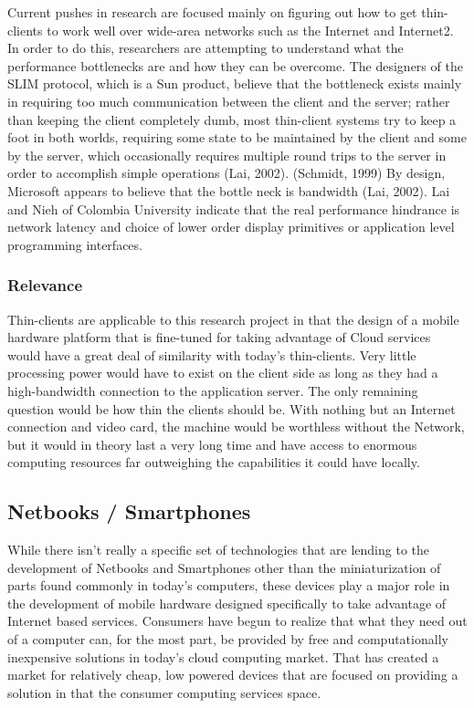 \documentclass[12pt,oneside,letterpaper]{article}
\begin{document}
Current pushes in research are focused mainly on figuring out how to get
thin-clients to work well over wide-area networks such as the Internet and
Internet2.  In order to do this, researchers are attempting to understand what
the performance bottlenecks are and how they can be overcome.  The designers of
the SLIM protocol, which is a Sun product, believe that the bottleneck exists
mainly in requiring too much communication between the client and the server;
rather than keeping the client completely dumb, most thin-client systems try to
keep a foot in both worlds, requiring some state to be maintained by the client
and some by the server, which occasionally requires multiple round trips to the
server in order to accomplish simple operations (Lai, 2002). (Schmidt, 1999) By
design, Microsoft appears to believe that the bottle neck is bandwidth (Lai,
2002).  Lai and Nieh of Colombia University indicate that the real performance
hindrance is network latency and choice of lower order display primitives or
application level programming interfaces.

\subsubsection{Relevance}

Thin-clients are applicable to this research project in that the design of a
mobile hardware platform that is fine-tuned for taking advantage of Cloud
services would have a great deal of similarity with today's thin-clients.  Very
little processing power would have to exist on the client side as long as they
had a high-bandwidth connection to the application server.  The only remaining
question would be how thin the clients should be.  With nothing but an Internet
connection and video card, the machine would be worthless without the Network,
but it would in theory last a very long time and have access to enormous
computing resources far outweighing the capabilities it could have locally.

\subsection{Netbooks / Smartphones}

While there isn't really a specific set of technologies that are lending to the
development of Netbooks and Smartphones other than the miniaturization of parts
found commonly in today's computers, these devices play a major role in the
development of mobile hardware designed specifically to take advantage of
Internet based services.  Consumers have begun to realize that what they need
out of a computer can, for the most part, be provided by free and
computationally inexpensive solutions in today's cloud computing market.  That
has created a market for relatively cheap, low powered devices that are focused
on providing a solution in that the consumer computing services space.
\end{document}

